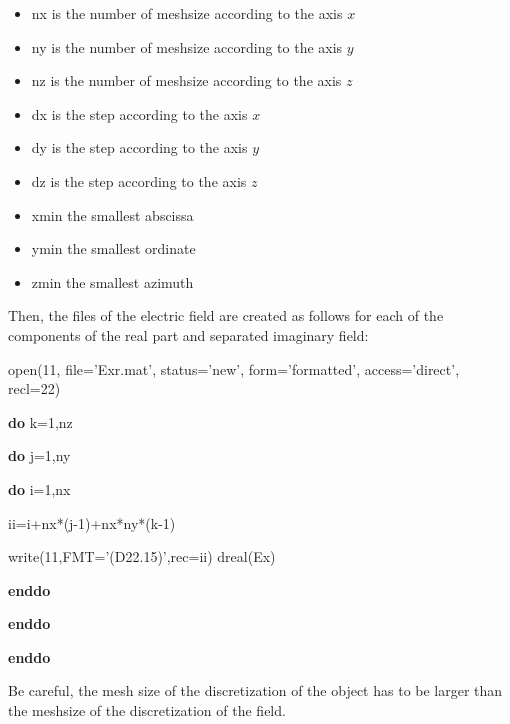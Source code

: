 \begin{itemize}
\item  nx is the number of meshsize according to the axis $x$
\item  ny is the number of meshsize according to the axis $y$
\item  nz is the number of meshsize according to the axis $z$
\item  dx is the step according to the axis $x$
\item  dy is the step according to the axis $y$
\item  dz is the step according to the axis $z$
\item xmin the smallest abscissa
\item ymin the smallest ordinate
\item zmin the smallest azimuth
\end{itemize}

Then, the files of the electric field are created as follows for 
each of the components of the real part and separated imaginary field:

\vspace{10mm}

open(11, file='Exr.mat', status='new', form='formatted', access='direct', recl=22)

{\bf do} k=1,nz

\hspace{5mm} {\bf do} j=1,ny

\hspace{10mm} {\bf do} i=1,nx 

\hspace{15mm} ii=i+nx*(j-1)+nx*ny*(k-1)

\hspace{15mm} write(11,FMT='(D22.15)',rec=ii) dreal(Ex)

\hspace{10mm} {\bf enddo}

\hspace{5mm} {\bf enddo}

{\bf enddo}

\vspace{10mm}

Be careful, the mesh size of the discretization of the object has to
be larger than the meshsize of the discretization of the field.
